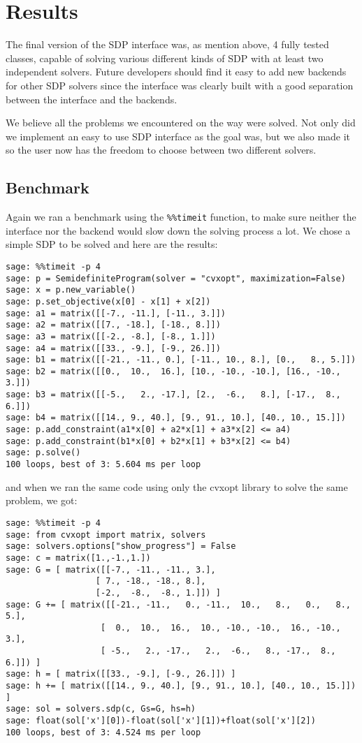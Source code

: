 \section{Results}
The final version of the SDP interface was, as mention above, 4 fully tested classes, capable of solving various different kinds of SDP with at least two independent solvers. Future developers should find it easy to add new backends for other SDP solvers since the interface was clearly built with a good separation between the interface and the backends.

We believe all the problems we encountered on the way were solved. Not only did we implement an easy to use SDP interface as the goal was, but we also made it so the user now has the freedom to choose between two different solvers.   


	\subsection{Benchmark}
	Again we ran a benchmark using the \texttt{\%\%timeit} function, to make sure neither the interface nor the backend would slow down the solving process a lot. We chose a simple SDP to be solved and here are the results:
	
	
\begin{verbatim}
sage: %%timeit -p 4
sage: p = SemidefiniteProgram(solver = "cvxopt", maximization=False)
sage: x = p.new_variable()
sage: p.set_objective(x[0] - x[1] + x[2])
sage: a1 = matrix([[-7., -11.], [-11., 3.]])
sage: a2 = matrix([[7., -18.], [-18., 8.]])
sage: a3 = matrix([[-2., -8.], [-8., 1.]])
sage: a4 = matrix([[33., -9.], [-9., 26.]])
sage: b1 = matrix([[-21., -11., 0.], [-11., 10., 8.], [0.,   8., 5.]])
sage: b2 = matrix([[0.,  10.,  16.], [10., -10., -10.], [16., -10., 3.]])
sage: b3 = matrix([[-5.,   2., -17.], [2.,  -6.,   8.], [-17.,  8., 6.]])
sage: b4 = matrix([[14., 9., 40.], [9., 91., 10.], [40., 10., 15.]])
sage: p.add_constraint(a1*x[0] + a2*x[1] + a3*x[2] <= a4)
sage: p.add_constraint(b1*x[0] + b2*x[1] + b3*x[2] <= b4)
sage: p.solve()
100 loops, best of 3: 5.604 ms per loop
\end{verbatim}

and when we ran the same code using only the cvxopt library to solve the same problem, we got:

\begin{verbatim}
sage: %%timeit -p 4 
sage: from cvxopt import matrix, solvers
sage: solvers.options["show_progress"] = False
sage: c = matrix([1.,-1.,1.])
sage: G = [ matrix([[-7., -11., -11., 3.],
                  [ 7., -18., -18., 8.],
                  [-2.,  -8.,  -8., 1.]]) ]
sage: G += [ matrix([[-21., -11.,   0., -11.,  10.,   8.,   0.,   8., 5.],
                   [  0.,  10.,  16.,  10., -10., -10.,  16., -10., 3.],
                   [ -5.,   2., -17.,   2.,  -6.,   8., -17.,  8., 6.]]) ]
sage: h = [ matrix([[33., -9.], [-9., 26.]]) ]
sage: h += [ matrix([[14., 9., 40.], [9., 91., 10.], [40., 10., 15.]]) ]
sage: sol = solvers.sdp(c, Gs=G, hs=h)
sage: float(sol['x'][0])-float(sol['x'][1])+float(sol['x'][2])
100 loops, best of 3: 4.524 ms per loop
\end{verbatim} 

